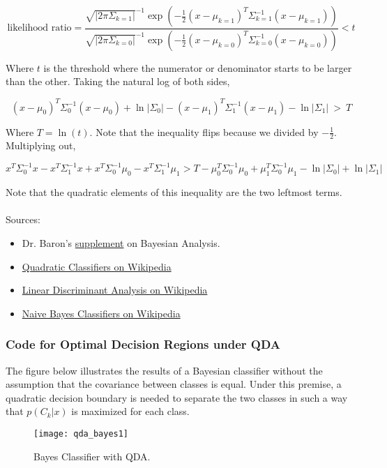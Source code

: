 \documentclass[]{../../ncmathy}
\begin{document}
			\begin{equation}
			\text{likelihood ratio} = \frac{ \sqrt{|2 \pi \Sigma_{k=1}|}^{-1} \exp \left( -\frac{1}{2}(x-\mu_{k=1})^T \Sigma_{k=1}^{-1} (x-\mu_{k=1}) \right) }{ \sqrt{|2 \pi \Sigma_{k=0}|}^{-1} \exp \left( -\frac{1}{2}(x-\mu_{k=0})^T \Sigma_{k=0}^{-1} (x-\mu_{k=0}) \right)} < t
			\end{equation}
			
			Where $t$ is the threshold where the numerator or denominator starts to be larger than the other. Taking the natural log of both sides,
			
			\begin{equation}
			(x- \mu_0)^T \Sigma_0^{-1} (x- \mu_0) + \ln|\Sigma_0| - (x- \mu_1)^T \Sigma_1^{-1} ( x- \mu_1) - \ln|\Sigma_1| \ > \ T
			\end{equation}
			
			Where $T = \ln(t)$. Note that the inequality flips because we divided by $-\frac{1}{2}$. Multiplying out,
			
			\begin{equation}
			x^T\Sigma_0^{-1}x - x^T\Sigma_1^{-1}x + x^T\Sigma_0^{-1}\mu_0 - x^T\Sigma_1^{-1}\mu_1 > T - \mu_0^T\Sigma_0^{-1}\mu_0 + \mu_1^T\Sigma_0^{-1}\mu_1 - \ln|\Sigma_0| + \ln|\Sigma_1|
			\end{equation}

			Note that the quadratic elements of this inequality are the two leftmost terms. 
			\\\\
			Sources:
			\begin{itemize}
				\item Dr. Baron's \href{https://courses.ncsu.edu/ece592/lec/059/supplements/supplement09152017.pdf}{supplement} on Bayesian Analysis.
				\item \href{https://en.wikipedia.org/wiki/Quadratic\_classifier}{Quadratic Classifiers on Wikipedia}
				\item \href{https://en.wikipedia.org/wiki/Linear\_discriminant\_analysis}{Linear Discriminant Analysis on Wikipedia}
				\item \href{https://en.wikipedia.org/wiki/Naive\_Bayes\_classifier}{Naive Bayes Classifiers on Wikipedia}
			\end{itemize}
		
		\subsubsection{Code for Optimal Decision Regions under QDA}
			The figure below illustrates the results of a Bayesian classifier without the assumption that the covariance between classes is equal. Under this premise, a quadratic decision boundary is needed to separate the two classes in such a way that $p(C_k|x)$ is maximized for each class.
			
			\begin{figure}[H]
			\centering\texttt{[image: qda\_bayes1]}
			\caption{Bayes Classifier with QDA.}
			\end{figure}
\end{document}
